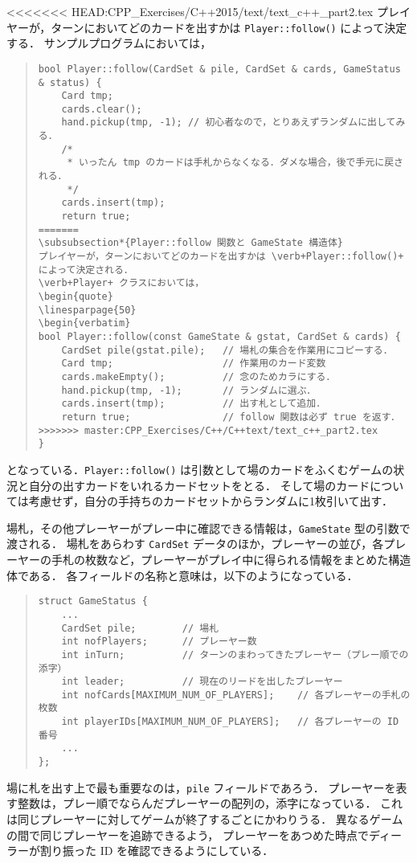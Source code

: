<<<<<<< HEAD:CPP_Exercises/C++2015/text/text_c++_part2.tex
プレイヤーが，ターンにおいてどのカードを出すかは \verb+Player::follow()+ によって決定する．
サンプルプログラムにおいては，
\begin{quote}
\begin{verbatim}
bool Player::follow(CardSet & pile, CardSet & cards, GameStatus & status) {
	Card tmp;
	cards.clear();
	hand.pickup(tmp, -1); // 初心者なので，とりあえずランダムに出してみる．
	/*
	 * いったん tmp のカードは手札からなくなる．ダメな場合，後で手元に戻される．
	 */
	cards.insert(tmp);
	return true;
=======
\subsubsection*{Player::follow 関数と GameState 構造体}
プレイヤーが，ターンにおいてどのカードを出すかは \verb+Player::follow()+ によって決定される．
\verb+Player+ クラスにおいては，
\begin{quote}
\linesparpage{50}
\begin{verbatim}
bool Player::follow(const GameState & gstat, CardSet & cards) {
    CardSet pile(gstat.pile);   // 場札の集合を作業用にコピーする．
    Card tmp;                   // 作業用のカード変数
    cards.makeEmpty();          // 念のためカラにする．
    hand.pickup(tmp, -1);       // ランダムに選ぶ．
    cards.insert(tmp);          // 出す札として追加．
    return true;                // follow 関数は必ず true を返す．
>>>>>>> master:CPP_Exercises/C++/C++text/text_c++_part2.tex
}
\end{verbatim}
\end{quote}
となっている．\verb+Player::follow()+ は引数として場のカードをふくむゲームの状況と自分の出すカードをいれるカードセットをとる．
そして場のカードについては考慮せず，自分の手持ちのカードセットからランダムに1枚引いて出す．


場札，その他プレーヤーがプレー中に確認できる情報は，\verb+GameState+ 型の引数で渡される．
場札をあらわす \verb+CardSet+ データのほか，プレーヤーの並び，各プレーヤーの手札の枚数など，プレーヤーがプレイ中に得られる情報をまとめた構造体である．
各フィールドの名称と意味は，以下のようになっている．
\begin{quote}
\begin{verbatim}
struct GameStatus {
    ...
	CardSet pile;        // 場札
	int nofPlayers;      // プレーヤー数
	int inTurn;          // ターンのまわってきたプレーヤー（プレー順での添字）
	int leader;          // 現在のリードを出したプレーヤー
	int nofCards[MAXIMUM_NUM_OF_PLAYERS];    // 各プレーヤーの手札の枚数
	int playerIDs[MAXIMUM_NUM_OF_PLAYERS];   // 各プレーヤーの ID 番号
    ...
};
\end{verbatim}
\end{quote}
場に札を出す上で最も重要なのは，\verb+pile+ フィールドであろう．
プレーヤーを表す整数は，プレー順でならんだプレーヤーの配列の，添字になっている．
これは同じプレーヤーに対してゲームが終了するごとにかわりうる．
異なるゲームの間で同じプレーヤーを追跡できるよう，
プレーヤーをあつめた時点でディーラーが割り振った ID を確認できるようにしている．

